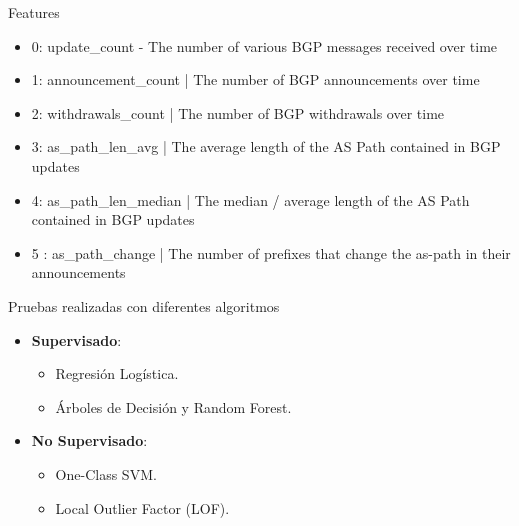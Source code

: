 \documentclass{beamer}
\begin{document}
\begin{frame}{Features}
	\begin{itemize}
		\item 0: update\_count - The number of various BGP messages received over time
		\item 1: announcement\_count | The number of BGP announcements over time
		\item 2: withdrawals\_count | The number of BGP withdrawals over time
		\item 3: as\_path\_len\_avg | The average length of the AS Path contained in BGP updates
		\item 4: as\_path\_len\_median | The median / average length of the AS Path contained in BGP updates
		\item 5 : as\_path\_change | The number of prefixes that change the as-path in their announcements
	\end{itemize}	
\end{frame}


\begin{frame}{Pruebas realizadas con diferentes algoritmos}
    \begin{itemize}
        \item \textbf{Supervisado}: 
        \begin{itemize}
            \item Regresión Logística.
            \item Árboles de Decisión y Random Forest.
        \end{itemize}
        \item \textbf{No Supervisado}:
        \begin{itemize}
            \item One-Class SVM.
            \item Local Outlier Factor (LOF).
        \end{itemize}
    \end{itemize}
\end{frame}
\end{document}
